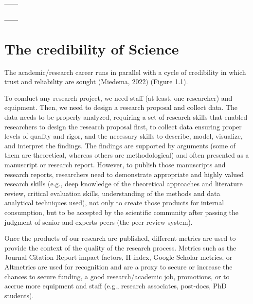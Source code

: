 \documentclass[
]{book}
\theoremstyle{definition}
\theoremstyle{definition}
\theoremstyle{definition}
\theoremstyle{definition}
\theoremstyle{remark}
\begin{document}
\begin{table}
{\begin{tabular}[t]{ll}
\cellcolor[HTML]{FFF4D1}{} & \cellcolor[HTML]{FFF4D1}{Text mining (qualitative research)}\\
\cellcolor[HTML]{FFF4D1}{} & \cellcolor[HTML]{FFF4D1}{Secondary sources (e.g., spatial data, census)}\\
\cellcolor[HTML]{FFF4D1}{} & \cellcolor[HTML]{FFF4D1}{Reproducibility and data reuse}\\
\cellcolor[HTML]{FFF4D1}{} & \cellcolor[HTML]{FFF4D1}{Publish in data journals}\\
\cellcolor[HTML]{FFF4D1}{} & \cellcolor[HTML]{FFF4D1}{Transparency}\\
\cellcolor[HTML]{FFF4D1}{} & \cellcolor[HTML]{FFF4D1}{Research integrity}\\
\bottomrule
\end{tabular}}
\end{table}

\hypertarget{the-credibility-of-science}{%
\section{The credibility of Science}\label{the-credibility-of-science}}

The academic/research career runs in parallel with a cycle of credibility in which trust and reliability are sought (Miedema, 2022) (Figure 1.1).

To conduct any research project, we need staff (at least, one researcher) and equipment. Then, we need to design a research proposal and collect data. The data needs to be properly analyzed, requiring a set of research skills that enabled researchers to design the research proposal first, to collect data ensuring proper levels of quality and rigor, and the necessary skills to describe, model, visualize, and interpret the findings. The findings are supported by arguments (some of them are theoretical, whereas others are methodological) and often presented as a manuscript or research report. However, to publish those manuscripts and research reports, researchers need to demonstrate appropriate and highly valued research skills (e.g., deep knowledge of the theoretical approaches and literature review, critical evaluation skills, understanding of the methods and data analytical techniques used), not only to create those products for internal consumption, but to be accepted by the scientific community after passing the judgment of senior and experts peers (the peer-review system).

Once the products of our research are published, different metrics are used to provide the context of the quality of the research process. Metrics such as the Journal Citation Report impact factors, H-index, Google Scholar metrics, or Altmetrics are used for recognition and are a proxy to secure or increase the chances to secure funding, a good research/academic job, promotions, or to accrue more equipment and staff (e.g., research associates, post-docs, PhD students).
\end{document}
